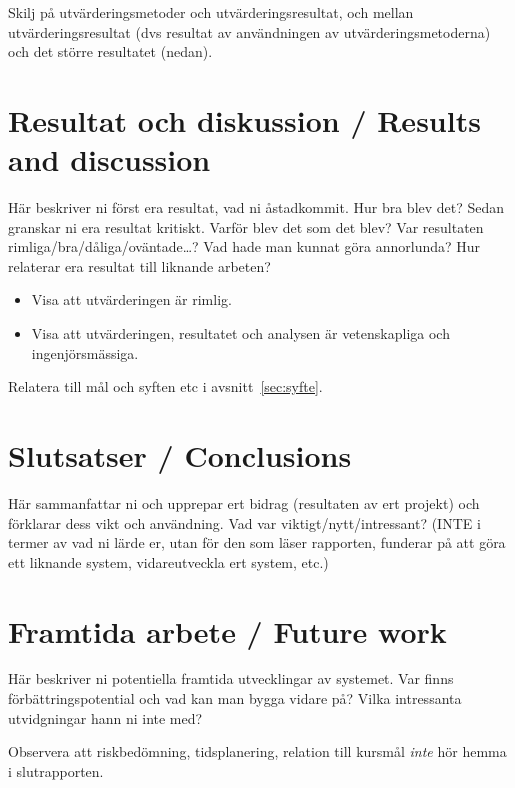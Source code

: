 \documentclass[a4paper,12pt]{article}
\begin{document}
Skilj på utvärderingsmetoder och utvärderingsresultat, och mellan utvärderingsresultat (dvs resultat av användningen av utvärderingsmetoderna) och det större resultatet (nedan).

\section{Resultat och diskussion / Results and discussion}
Här beskriver ni först era resultat, vad ni åstadkommit.  Hur bra blev det?
Sedan granskar ni era resultat kritiskt.  Varför blev det som det blev?  Var resultaten rimliga/bra/dåliga/o\-vän\-ta\-de\ldots?  
Vad hade man kunnat göra annorlunda?  Hur relaterar era resultat till liknande arbeten?  

\begin{itemize}
\item Visa att utvärderingen är rimlig.
\item Visa att utvärderingen, resultatet och analysen är vetenskapliga och ingenjörsmässiga.
\end{itemize}

Relatera till mål och syften etc i avsnitt~\ref{sec:syfte}.

\section{Slutsatser / Conclusions}
Här sammanfattar ni och upprepar ert bidrag (resultaten av ert projekt) och förklarar dess vikt och användning.  Vad var viktigt/nytt/intressant?  (INTE i termer av vad ni lärde er, utan för den som läser rapporten, funderar på att göra ett liknande system, vidareutveckla ert system, etc.)

\section{Framtida arbete / Future work}
Här beskriver ni potentiella framtida utvecklingar av systemet. Var finns förbättrings\-poten\-tial och vad kan man bygga vidare på? Vilka intressanta utvidgningar hann ni inte med?

Observera att risk\-be\-döm\-ning, tids\-planering, relation till kursmål \emph{inte} hör hemma i slutrapporten.

%

\end{document}

